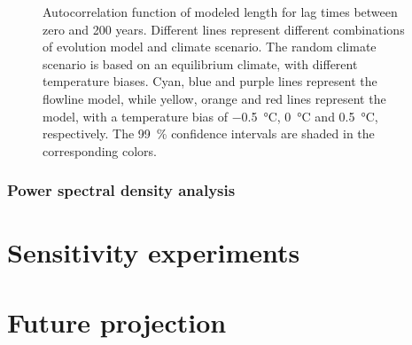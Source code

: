 \begin{figure}[htp]
\begin{subfigure}[b]{0.48\textwidth}
        \end{subfigure}

        \caption{Autocorrelation function of modeled length for lag times between zero and 200 years. Different lines represent different combinations of evolution model and climate scenario.
        The random climate scenario is based on an equilibrium climate, with different temperature biases.
        Cyan, blue and purple lines represent the flowline model, while yellow, orange and red lines represent the \vas{} model, with a temperature bias of \SI{-.5}{\celsius}, \SI{0}{\celsius} and \SI{+.5}{\celsius}, respectively.
        The \SI{99}{\percent} confidence intervals are shaded in the corresponding colors.}
        \label{fig:acf}
      \end{figure}
    

    \subsubsection{Power spectral density analysis} %
    \label{ssub:power_spectral_density_analysis}
    


\section{Sensitivity experiments} %
\label{sec:sensitivity_experiments_results}


\section{Future projection} %
\label{sec:future_projection_results}

